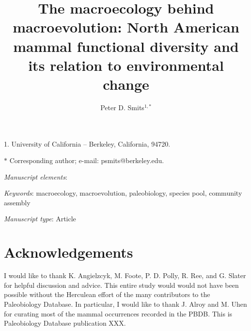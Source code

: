 \documentclass[11pt]{article}
\title{The macroecology behind macroevolution: North American mammal functional diversity and its relation to environmental change}
\author{Peter D. Smits$^{1, \ast}$\\}
\date{}
\begin{document}
\maketitle

\noindent{}1. University of California -- Berkeley, California, 94720.

\noindent{}$\ast$ Corresponding author; e-mail: psmits@berkeley.edu.

\bigskip

\textit{Manuscript elements}:

\bigskip

\textit{Keywords}: macroecology, macroevolution, paleobiology, species pool, community assembly

\bigskip

\textit{Manuscript type}: Article

\bigskip


\linenumbers
\modulolinenumbers[2]

\newpage{}












\section*{Acknowledgements}
I would like to thank K. Angielzcyk, M. Foote, P. D. Polly, R. Ree, and G. Slater for helpful discussion and advice. This entire study would would not have been possible without the Herculean effort of the many contributors to the Paleobiology Database. In particular, I would like to thank J. Alroy and M. Uhen for curating most of the mammal occurrences recorded in the PBDB. This is Paleobiology Database publication XXX.




\end{document}
